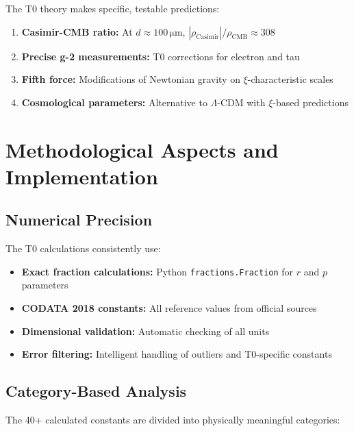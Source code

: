 \documentclass[12pt,a4paper]{report}
\begin{document}
	The T0 theory makes specific, testable predictions:
	
	\begin{enumerate}
		\item \textbf{Casimir-CMB ratio:} At $d \approx 100\,\si{\micro\meter}$, $|\rho_{\text{Casimir}}|/\rho_{\text{CMB}} \approx 308$
		\item \textbf{Precise g-2 measurements:} T0 corrections for electron and tau
		\item \textbf{Fifth force:} Modifications of Newtonian gravity on $\xi$-characteristic scales
		\item \textbf{Cosmological parameters:} Alternative to $\Lambda$-CDM with $\xi$-based predictions
	\end{enumerate}
	
	\section{Methodological Aspects and Implementation}
	
	\subsection{Numerical Precision}
	
	The T0 calculations consistently use:
	
	\begin{itemize}
		\item \textbf{Exact fraction calculations:} Python \texttt{fractions.Fraction} for $r$ and $p$ parameters
		\item \textbf{CODATA 2018 constants:} All reference values from official sources
		\item \textbf{Dimensional validation:} Automatic checking of all units
		\item \textbf{Error filtering:} Intelligent handling of outliers and T0-specific constants
	\end{itemize}
	
	\subsection{Category-Based Analysis}
	
	The 40+ calculated constants are divided into physically meaningful categories:
	
\end{document}
